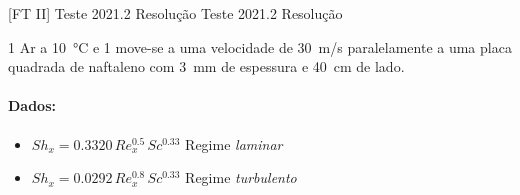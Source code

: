 \documentclass[\mainfilename]{subfiles}
\begin{document}

[FT II]
{Teste 2021.2 Resolução} %
{Teste 2021.2 Resolução} %

\begin{questionBox}1{ %
    Ar a \qty*{10}{\celsius} e \qty*{1}{\atm} move-se a uma velocidade de \qty*{30}{\metre/\second} paralelamente a uma placa quadrada de naftaleno com \qty*{3}{\milli\metre} de espessura e \qty*{40}{\centi\metre} de lado.
} %
    \def\naft{\text{naft}}
    \def\ar{\text{ar}}
    \paragraph*{Dados:}
    \begin{itemize}
        \item \(Sh_x=0.3320\,Re_x^{0.5}\,Sc^{0.33}\) Regime \emph{laminar}
        \item \(Sh_x=0.0292\,Re_x^{0.8}\,Sc^{0.33}\) Regime \emph{turbulento}
    \end{itemize}
\end{questionBox}
\end{document}
